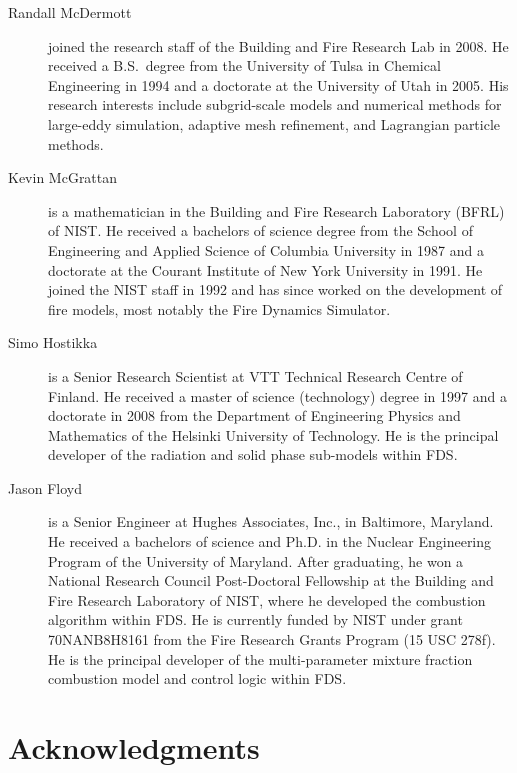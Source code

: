 \documentclass[11pt]{book}
\begin{document}
\begin{description}
\item[Randall McDermott] joined the research staff of the Building and Fire Research Lab in 2008. He received a B.S.~degree from the University of Tulsa in Chemical Engineering in 1994 and a doctorate at the University of Utah in 2005. His research interests include subgrid-scale models and numerical methods for large-eddy simulation, adaptive mesh refinement, and Lagrangian particle methods.
\item[Kevin McGrattan] is a mathematician in the Building and Fire Research Laboratory (BFRL) of NIST. He received a bachelors of science degree from the School of Engineering and Applied Science of Columbia University in 1987 and a doctorate at the Courant Institute of New York University in 1991. He joined the NIST staff in 1992 and has since worked on the development of fire models, most notably the Fire Dynamics Simulator.
\item[Simo Hostikka] is a Senior Research Scientist at VTT Technical Research Centre of Finland. He received a master of science (technology) degree in 1997 and a doctorate in 2008 from the Department of Engineering Physics and Mathematics of the Helsinki University of Technology.  He is the principal developer of the radiation and solid phase sub-models within FDS.
\item[Jason Floyd] is a Senior Engineer at Hughes Associates, Inc., in Baltimore, Maryland. He received a bachelors of science and Ph.D. in the Nuclear Engineering Program of the University of Maryland. After graduating, he won a National Research Council Post-Doctoral Fellowship at the Building and Fire Research Laboratory of NIST, where he developed the combustion algorithm within FDS. He is currently funded by NIST under grant 70NANB8H8161 from the Fire Research Grants Program (15 USC 278f). He is the principal developer of the multi-parameter mixture fraction combustion model and control logic within FDS.
\end{description}



\chapter{Acknowledgments}

\label{acksection}
\end{document}

